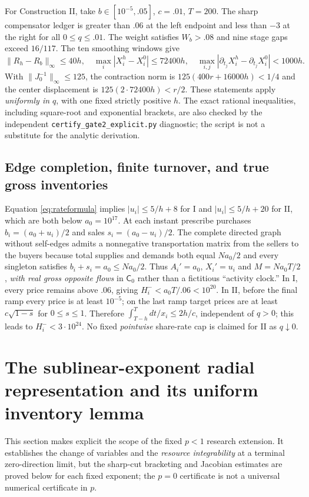 \documentclass[review,hidelinks,onefignum,onetabnum]{siamonline250211}%
\begin{document}
For Construction II, take
$b\in[10^{-5},.05]$, $c=.01$, $T=200$.
The sharp compensator ledger is greater than $.06$ at the left
endpoint and less than $-3$ at the right for all
$0\le q\le.01$. The weight satisfies $W_b>.08$ and
nine stage gaps exceed $16/117$. The ten smoothing windows give
\[
 \|R_h-R_b\|_\infty\le40h,\quad
 \max_i|X_i^h-X_i^0|\le72400h,\quad
 \max_{i,j}|\partial_{t_j}X_i^h-
                    \partial_{t_j}X_i^0|<1000h.
\]
With $\|J_0^{-1}\|_\infty\le125$, the contraction norm is
$125(400r+16000h)<1/4$ and the center displacement
is $125(2\cdot72400h)<r/2$. These statements apply
\emph{uniformly in $q$}, with one fixed strictly positive $h$.
The exact rational inequalities, including square-root and
exponential brackets, are also checked by the independent
\texttt{certify\_gate2\_explicit.py} diagnostic; the script
is not a substitute for the analytic derivation.

\subsection{Edge completion, finite turnover, and true gross inventories}
Equation \eqref{eq:rateformula} implies
$|u_i|\le5/h+8$ for I and $|u_i|\le5/h+20$ for II,
which are both below $a_0=10^{17}$. At each instant prescribe
purchases $b_i=(a_0+u_i)/2$ and sales $s_i=(a_0-u_i)/2$.
The complete directed graph without self-edges admits a
nonnegative transportation matrix from the sellers to the
buyers because total supplies and demands both equal
$Na_0/2$ and every singleton satisfies
$b_i+s_i=a_0\le Na_0/2$.
Thus $A_i'=a_0$, $X_i'=u_i$ and
$M=Na_0T/2$, \emph{with real gross opposite flows} in
$\mathsf C_0$ rather than a fictitious ``activity clock.''
In I, every price remains above $.06$, giving
$H_i^-<a_0T/.06<10^{20}$. In II, before the final ramp every
price is at least $10^{-5}$; on the last ramp target prices are
at least $c\sqrt{1-s}$ for $0\le s\le1$. Therefore
$\int_{T-h}^T dt/x_i\le2h/c$, independent of $q>0$;
this leads to $H_i^-<3\cdot10^{24}$.
No fixed \emph{pointwise} share-rate cap is claimed for II as
$q\downarrow0$.

\section{The sublinear-exponent radial representation and its uniform inventory lemma}
\label{app:general-p}
This section makes explicit the scope of the fixed $p<1$
research extension. It establishes the change of variables and
the \emph{resource integrability} at a terminal zero-direction
limit, but the sharp-cut bracketing and Jacobian estimates
are proved below for each fixed exponent; the $p=0$ certificate
is not a universal numerical certificate in $p$.
\end{document}

